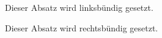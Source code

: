 \documentclass{article}
\begin{document}
  \begin{flushleft}
    Dieser Absatz wird linksbündig gesetzt.
  \end{flushleft}

  \begin{flushright}
    Dieser Absatz wird rechtsbündig gesetzt.
  \end{flushright}
\end{document}

